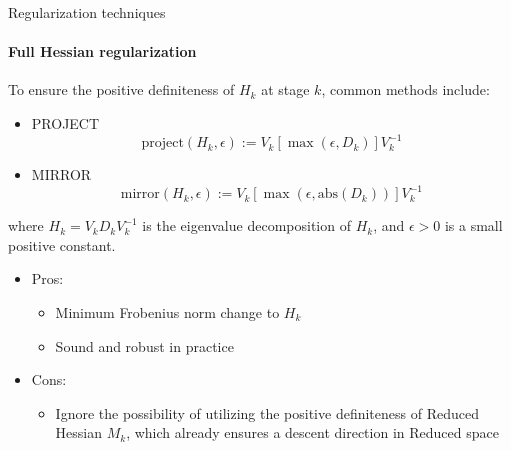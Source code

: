 \documentclass[10pt,aspectratio=1610]{beamer} %
\begin{document}
\begin{frame}{Regularization techniques}
    \framesubtitle{Full Hessian regularization}
    To ensure the positive definiteness of $H_k$ at stage $k$, common methods include:
	\begin{itemize}
		\item PROJECT
		\begin{equation*}
		    \mathrm{project}(H_k, \epsilon) := V_k [\max(\epsilon, D_k)] V_k^{-1}
		\end{equation*}
		\item MIRROR
		\begin{equation*}
			\mathrm{mirror}(H_k, \epsilon) := V_k [\max(\epsilon, \mathrm{abs}(D_k))] V_k^{-1}
		\end{equation*}
	\end{itemize}
    where $H_k = V_k D_k V_k^{-1}$ is the eigenvalue decomposition of $H_k$, and $\epsilon > 0$ is a small positive constant. \\
    \begin{itemize}
        \item Pros:
            \begin{itemize}
                \item Minimum Frobenius norm change to $H_k$
                \item Sound and robust in practice
            \end{itemize}
        \item Cons:
            \begin{itemize}
                \item Ignore the possibility of utilizing the positive definiteness of Reduced Hessian $M_k$, which already ensures a descent direction in Reduced space
            \end{itemize}
    \end{itemize}
\end{frame}
\end{document}
